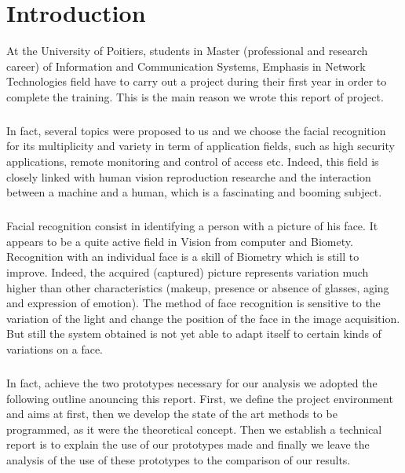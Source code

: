 \chapter*{Introduction}

At the University of Poitiers, students in Master (professional and research career) of Information and Communication Systems, Emphasis in Network Technologies field have to carry out a project during their first year in order to complete the training. This is the main reason we wrote this report of project.   
\paragraph{}
In fact, several topics were proposed to us and we choose the facial recognition for its multiplicity and variety in term of application fields, such as high security applications, remote monitoring and control of access etc. Indeed, this field is closely linked with human vision reproduction researche and the interaction between a machine and a human, which is a fascinating and booming subject.
\paragraph{}
Facial recognition consist in identifying a person with a picture of his face. It appears to be a quite active field in Vision from computer and Biomety. Recognition with an individual face is a skill of Biometry which is still to improve. Indeed, the acquired (captured) picture represents variation much higher than other characteristics (makeup, presence or absence of glasses, aging and expression of emotion). The method of face recognition is sensitive to the variation of the light and change the position of the face in the image acquisition. But still the system obtained is not yet able to adapt itself to certain kinds of variations on a face.
\paragraph{}
In fact, achieve the two prototypes necessary for our analysis we adopted the following outline anouncing this report. First, we define the project environment and aims at first, then we develop the state of the art methods to be programmed, as it were the theoretical concept. Then we establish a technical report is to explain the use of our prototypes made and finally we leave the analysis of the use of these prototypes to the comparison of our results.

